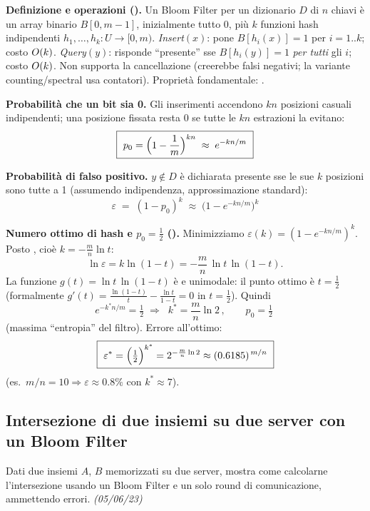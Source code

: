 \textbf{Definizione e operazioni ().} Un Bloom Filter per un dizionario $D$ di $n$ chiavi
\`e un array binario $B[0,m-1]$, inizialmente tutto 0, pi\`u $k$ funzioni hash indipendenti
$h_1,\dots,h_k:U\to[0,m)$.
\emph{Insert}$(x)$: pone $B[h_i(x)]=1$ per $i=1..k$; costo $O\!\left(k\right)$.
\emph{Query}$(y)$: risponde ``presente'' sse $B[h_i(y)]=1$ \emph{per tutti} gli $i$; costo
$O\!\left(k\right)$. Non supporta la cancellazione (creerebbe falsi negativi; la variante counting/spectral
usa contatori). Propriet\`a fondamentale: .

\textbf{Probabilit\`a che un bit sia 0.} Gli inserimenti accendono $kn$ posizioni casuali
indipendenti; una posizione fissata resta 0 se tutte le $kn$ estrazioni la evitano:
\[
\boxed{\ p_0=\Bigl(1-\frac{1}{m}\Bigr)^{kn}\;\approx\;e^{-kn/m}\ }
\]

\textbf{Probabilit\`a di falso positivo.} $y\notin D$ \`e dichiarata presente sse le sue $k$
posizioni sono tutte a 1 (assumendo indipendenza, approssimazione standard):
\[
\boxed{\ \varepsilon\;=\;(1-p_0)^{k}\;\approx\;\bigl(1-e^{-kn/m}\bigr)^{k}\ }
\]

\textbf{Numero ottimo di hash e $p_0=\tfrac12$ ().} Minimizziamo
$\varepsilon(k)=(1-e^{-kn/m})^k$. Posto , cio\`e $k=-\frac{m}{n}\ln t$:
\[
\ln\varepsilon=k\ln(1-t)=-\frac{m}{n}\,\ln t\,\ln(1-t).
\]
La funzione $g(t)=\ln t\,\ln(1-t)$ \`e  e unimodale: il
punto ottimo \`e $t=\tfrac12$ (formalmente $g'(t)=\frac{\ln(1-t)}{t}-\frac{\ln t}{1-t}=0$ in
$t=\frac12$). Quindi
\[
e^{-k^{*}n/m}=\tfrac12
\;\Longrightarrow\;
\boxed{\;k^{*}=\frac{m}{n}\ln2\,,\qquad p_0=\tfrac12\;}
\]
 (massima ``entropia'' del filtro).
Errore all'ottimo:
\[
\boxed{\ \varepsilon^{*}=\Bigl(\tfrac12\Bigr)^{k^{*}}=2^{-\frac{m}{n}\ln2}
\approx(0.6185)^{\,m/n}\ }
\]
(es.\ $m/n=10\Rightarrow\varepsilon\approx0.8\%$ con $k^*\approx7$).

\subsection*{ Intersezione di due insiemi su due server con un Bloom Filter}

\begin{domanda}
Dati due insiemi $A$, $B$ memorizzati su due server, mostra come calcolarne l'intersezione usando
un Bloom Filter e un solo round di comunicazione, ammettendo errori. \emph{(05/06/23)}
\end{domanda}

